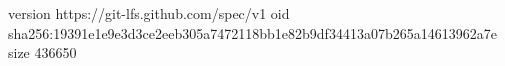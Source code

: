 version https://git-lfs.github.com/spec/v1
oid sha256:19391e1e9e3d3ce2eeb305a7472118bb1e82b9df34413a07b265a14613962a7e
size 436650
